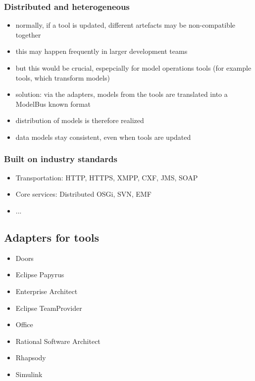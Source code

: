 \subsubsection{Distributed and heterogeneous}

\begin{itemize}
\item normally, if a tool is updated, different artefacts may be non-compatible together
\item this may happen frequently in larger development teams
\item but this would be crucial, espepcially for model operations tools (for example tools, which transform models)
\item solution: via the adapters, models from the tools are translated into a ModelBus known format
\item distribution of models is therefore realized
\item data models stay consistent, even when tools are updated
\end{itemize}

\subsubsection{Built on industry standards}

\begin{itemize}
\item Transportation: HTTP, HTTPS, XMPP, CXF, JMS, SOAP
\item Core services: Distributed OSGi, SVN, EMF
\item  ...
\end{itemize}

\subsection{Adapters for tools}

\begin{itemize}
\item Doors
\item Eclipse Papyrus
\item Enterprise Architect
\item Eclipse TeamProvider
\item Office
\item Rational Software Architect
\item Rhapsody
\item Simulink
\end{itemize}

